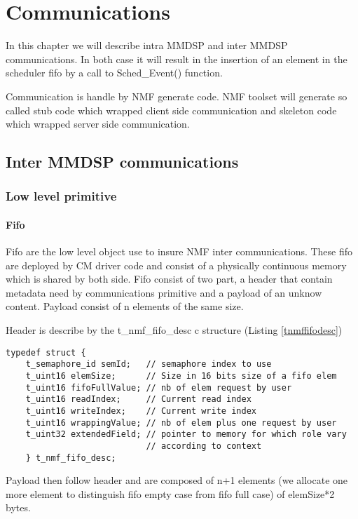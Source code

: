 \chapter{Communications}
In this chapter we will describe intra MMDSP and inter MMDSP communications.
In both case it will result in the insertion of an element in the
scheduler fifo by a call to Sched\_Event() function.

Communication is handle by NMF generate code. NMF toolset will generate so
called stub code which wrapped client side communication and skeleton code which
wrapped server side communication.


\section{Inter MMDSP communications}
\subsection{Low level primitive}
\subsubsection{Fifo}
Fifo are the low level object use to insure NMF inter communications. These fifo
are deployed by CM driver code and consist of a physically continuous memory
which is shared by both side. Fifo consist of two part, a header that contain
metadata need by communications primitive and a payload of an unknow content.
Payload consist of n elements of the same size.

Header is describe by the t\_nmf\_fifo\_desc c structure (Listing
\ref{tnmffifodesc})
\begin{lstlisting}[caption=fifo header structure, label=tnmffifodesc]
typedef struct {
    t_semaphore_id semId;   // semaphore index to use
    t_uint16 elemSize;      // Size in 16 bits size of a fifo elem
    t_uint16 fifoFullValue; // nb of elem request by user
    t_uint16 readIndex;     // Current read index
    t_uint16 writeIndex;    // Current write index
    t_uint16 wrappingValue; // nb of elem plus one request by user
    t_uint32 extendedField; // pointer to memory for which role vary
                            // according to context
    } t_nmf_fifo_desc;
\end{lstlisting}

Payload then follow header and are composed of n+1 elements (we allocate one
more element to distinguish fifo empty case from fifo full case) of elemSize*2
bytes.

